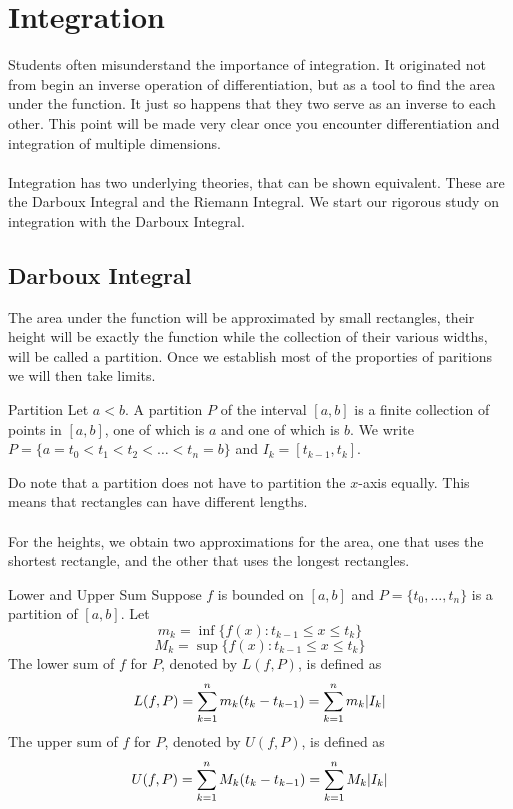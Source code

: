 \documentclass[a4paper]{article}
\begin{document}
\pagebreak
\section{Integration}
Students often misunderstand the importance of integration. It originated not from begin an inverse operation of differentiation, but as a tool to find the area under the function. It just so happens that they two serve as an inverse to each other. This point will be made very clear once you encounter differentiation and integration of multiple dimensions. \\~\\
Integration has two underlying theories, that can be shown equivalent. These are the Darboux Integral and the Riemann Integral. We start our rigorous study on integration with the Darboux Integral. 
\subsection{Darboux Integral}
The area under the function will be approximated by small rectangles, their height will be exactly the function while the collection of their various widths, will be called a partition. Once we establish most of the proporties of paritions we will then take limits. 
\begin{defn}{Partition}{} Let $a<b$. A partition $P$ of the interval $[a,b]$ is a finite collection of points in $[a,b]$, one of which is $a$ and one of which is $b$. We write $P=\{a=t_0<t_1<t_2<\dots<t_n=b\}$ and $I_k=[t_{k-1},t_k]$. 
\end{defn}

Do note that a partition does not have to partition the $x$-axis equally. This means that rectangles can have different lengths. \\~\\
For the heights, we obtain two approximations for the area, one that uses the shortest rectangle, and the other that uses the longest rectangles. 

\begin{defn}{Lower and Upper Sum}{} Suppose $f$ is bounded on $[a,b]$ and $P=\{t_0,\dots,t_n\}$ is a partition of $[a,b]$. Let $$m_k=\inf\{f(x):t_{k-1}\leq x\leq t_k\}$$ $$M_k=\sup\{f(x):t_{k-1}\leq x\leq t_k\}$$ The lower sum of $f$ for $P$, denoted by $L(f,P)$, is defined as $$L(f,P)=\sum_{k=1}^nm_k(t_k-t_{k-1})=\sum_{k=1}^nm_k\abs{I_k}$$ The upper sum of $f$ for $P$, denoted by $U(f,P)$, is defined as $$U(f,P)=\sum_{k=1}^nM_k(t_k-t_{k-1})=\sum_{k=1}^nM_k\abs{I_k}$$
\end{defn}
\end{document}
